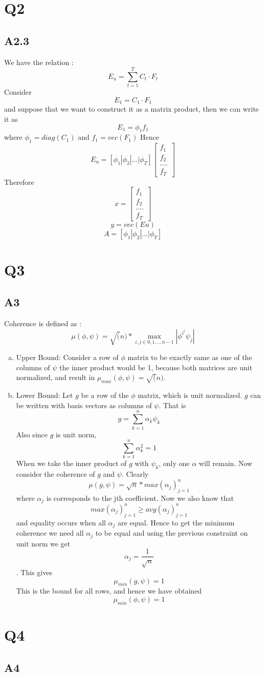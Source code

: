\documentclass{article}
\begin{document}
\section*{Q2}
\subsection*{A2.3}
We have the relation : $$E_u = \sum_{t=1}^TC_t \cdot F_t$$
Consider $$E_1 = C_1 \cdot F_1$$ and suppose that we want to construct it as a matrix product, then we can write it as
$$E_1 = \phi_1 f_1$$ where $\phi_1 = diag(C_1)$ and $f_1 = vec(F_1)$
Hence $$E_u = [\phi_1 | \phi_2 |...| \phi_T] \begin{bmatrix}
  f_1\\ f_2 \\....\\ f_T \end{bmatrix} $$
Therefore $$x = \begin{bmatrix}
  f_1\\ f_2 \\....\\ f_T \end{bmatrix}$$
$$ y = vec(Eu)$$
$$A = [\phi_1 | \phi_2 |...| \phi_T]$$




\section*{Q3}
\subsection*{A3}
Coherence is defined as : $$\mu(\phi,\psi) = \sqrt(n)*\max_{i,j \in {0,1,..,n-1}} |\phi^{i^{t}}\psi_j|$$

\begin{enumerate}[(a)]
\item Upper Bound:
  Consider a row of $\phi$ matrix to be exactly same as one of the columns of $\psi$ the inner product would be 1, because both matrices are unit normalized, and result in $\mu_{max}(\phi,\psi) = \sqrt(n)$.
\item Lower Bound:
  Let $g$ be a row of the $\phi$ matrix, which is unit normalized. $g$ can be written with basis vectors as columns of $\psi$. That is
  $$g = \sum_{k=1}^{n}\alpha_k \psi_k$$
  Also since $g$ is unit norm, $$\sum_{k=1}^n\alpha_k^2 = 1$$
  When we take the inner product of $g$ with $\psi_k$, only one $\alpha$ will remain. Now consider the coherence of $g$ and $\psi$. Clearly
  $$\mu(g,\psi) = \sqrt{n} * max(\alpha_j)_{j=1}^n$$ where $\alpha_j$ is corresponds to the jth coefficient. Now we also know that $$max(\alpha_j)_{j=1}^n \ge avg(\alpha_j)_{j=1}^n$$ and equality occurs when all $\alpha_j$ are equal. Hence to get the minimum coherence we need all $\alpha_j$ to be equal and using the previous constraint on unit norm we get $$\alpha_j = \frac{1}{\sqrt{n}}$$. This gives $$\mu_{min}(g,\psi) = 1$$
  This is the bound for all rows, and hence we have obtained $$\mu_{min}(\phi,\psi) = 1$$
\end{enumerate}

\section*{Q4}
\subsection*{A4}
\end{document}
